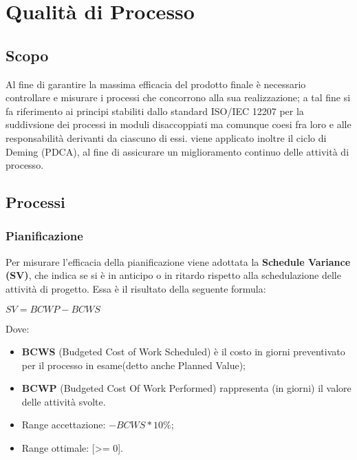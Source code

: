 \chapter{Qualità di Processo}
\label{processo} 
\section{Scopo}
Al fine di garantire la massima efficacia del prodotto finale è necessario controllare e misurare i processi che concorrono alla sua realizzazione; a tal fine si fa riferimento ai principi stabiliti dallo standard ISO/IEC 12207 per la suddivsione dei processi in moduli disaccoppiati ma comunque coesi fra loro e alle responsabilità derivanti da ciascuno di essi.
viene applicato inoltre il ciclo di Deming (PDCA), al fine di assicurare un miglioramento continuo delle attività di processo. 

\section{Processi}

\subsection{Pianificazione}
Per misurare l'efficacia della pianificazione viene adottata la \textbf{Schedule Variance (SV)}, che indica se si è in anticipo o in ritardo rispetto alla schedulazione delle attività di progetto.
Essa è il risultato della seguente formula:\\
\begin{center}
	\begin{math}
	SV = BCWP - BCWS
	\end{math}
\end{center}
Dove:
\begin{itemize}
	\item[] \textbf{BCWS}\label{bcws} (Budgeted Cost of Work Scheduled) è il costo in giorni preventivato per il processo in esame(detto anche Planned Value);
	\item[] \textbf{BCWP}\label{bcwp} (Budgeted Cost Of Work Performed) rappresenta (in giorni) il valore delle attività svolte.
\end{itemize}

\begin{itemize}
	\item Range accettazione: $-BCWS *10\%$;
	\item Range ottimale: [>= 0].
\end{itemize}



